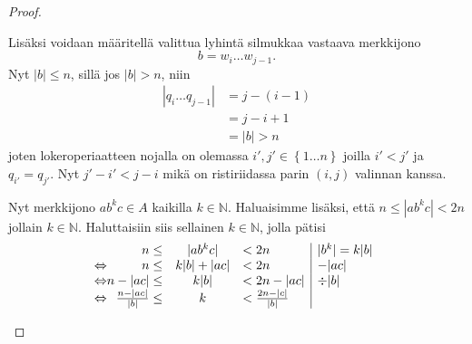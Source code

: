 \documentclass[a4paper,11pt,draft]{article}
\newcommand{\set}[1]{{\left\{ #1 \right\}}}
\newcommand{\Nat}{\mathbb{N}}
\begin{document}
\begin{enumerate}
\begin{enumerate}
\begin{proof}
\begin{description}
          Lisäksi voidaan määritellä valittua lyhintä silmukkaa
          vastaava merkkijono
          \begin{equation*}
              b = w_i \dots w_{j-1}.
          \end{equation*}
          Nyt $|b| \le n$, sillä jos $|b| > n$, niin
          \begin{align*}
              |q_i \dots q_{j-1}| & = j - (i - 1) \\
                                  & = j - i + 1 \\
                                  & = |b| > n
          \end{align*}
          joten lokeroperiaatteen nojalla on olemassa $i', j' \in
          \set{1 \dots n}$ joilla $i' < j'$ ja $q_{i'} = q_{j'}$. Nyt
          $j' - i' < j - i$ mikä on ristiriidassa parin $(i, j)$ valinnan
          kanssa.

          Nyt merkkijono $ab^kc \in A$ kaikilla $k \in \Nat$.
          Haluaisimme lisäksi, että $n \le |ab^kc| < 2n$ jollain $k
          \in \Nat$. Haluttaisiin siis sellainen $k \in \Nat$, jolla pätisi
          \begin{equation*}
          \begin{array}{@{}r@{}rcl|l}
            & n \le & |ab^kc| & < 2n & |b^k| = k|b| \\
            \Leftrightarrow
            & n \le & k|b| + |ac| & < 2n & -|ac| \\
            \Leftrightarrow
            & n - |ac| \le & k|b| & < 2n - |ac| & \div |b| \\
            \Leftrightarrow &
            \frac{n - |ac|}{|b|} \le & k & < \frac{2n - |c|}{|b|} \\
          \end{array}
          \end{equation*}


\end{description}
\end{proof}
\end{enumerate}
\end{enumerate}
\end{document}
